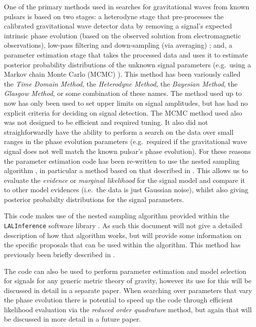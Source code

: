 \documentclass[aps,prd,showpacs,superscriptaddress,twocolumn,preprintnumbers,altaffilletter]{revtex4-1}
\newcommand{\gws}{gravitational waves\xspace}
\newcommand{\gw}{gravitational wave\xspace}
\newcommand{\lalinf}{\texttt{LALInference}\xspace}
\begin{document}
One of the primary methods used in searches for \gws from known pulsars is based on two stages: a heterodyne
stage that pre-processes the calibrated \gw detector data by removing a signal's expected intrinsic phase
evolution (based on the observed solution from electromagnetic observations), low-pass filtering and
down-sampling (via averaging) \cite{2005PhRvD..72j2002D}; and, a parameter estimation stage that takes the
processed data and uses it to estimate posterior probability distributions of the unknown signal parameters
(e.g.\ using a Markov chain Monte Carlo (MCMC) \cite{2010ApJ...713..671A}). This method has been variously
called the {\it Time Domain Method}, the {\it Heterodyne Method}, the {\it Bayesian Method}, the {\it Glasgow
Method}, or some combination of these names. The method used up to now has only been used to set upper limits
on signal amplitudes, but has had no explicit criteria for deciding on signal detection. The MCMC method used
also was not designed to be efficient and required tuning. It also did not straighforwardly have the ability
to perform a search on the data over small ranges in the phase evolution parameters (e.g.\ required if the
\gw signal does not well match the known pulsar's phase evolution). For these reasons the parameter
estimation code has been re-written to use the nested sampling algorithm \cite{Skilling:2006}, in particular
a method based on that described in \cite{Veitch:2010}. This allows us to evaluate the {\it evidence} or {\it
marginal likelihood} for the signal model and compare it to other model evidences (i.e.\ the data is just
Gaussian noise), whilst also giving posterior probabilty distributions for the signal parameters.

This code makes use of the nested sampling algorithm provided within the \lalinf software library
\citep{2015PhRvD..91d2003V}. As such this document will not give a detailed description of how that algorithm
works, but will provide some information on the specific proposals that can be used within the algorithm.
This method has previously been briefly described in \cite{2012JPhCS.363a2041P}.

The code can also be used to perform parameter estimation and model selection for signals for any generic
metric theory of gravity, however its use for this will be discussed in detail in a separate paper. When
searching over parameters that vary the phase evolution there is potential to speed up the code through
efficient likelihood evaluation via the {\it reduced order quadrature} method, but again that will be
discussed in more detail in a future paper.
\end{document}

